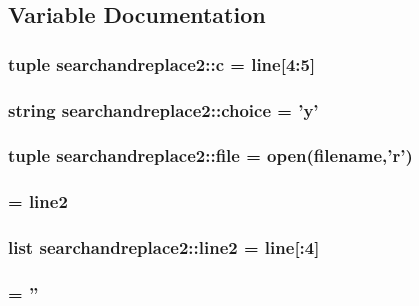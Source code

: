 \subsection{Variable Documentation}
\hypertarget{namespacesearchandreplace2_a3eef88240d5197333eeec54ea8790760}{
\subsubsection[{c}]{\setlength{\rightskip}{0pt plus 5cm}tuple {\bf searchandreplace2::c} = {\bf line}\mbox{[}4:5\mbox{]}}}
\label{namespacesearchandreplace2_a3eef88240d5197333eeec54ea8790760}
\hypertarget{namespacesearchandreplace2_a0b33cdf2d68e113792cf457aa40e09e4}{
\subsubsection[{choice}]{\setlength{\rightskip}{0pt plus 5cm}string {\bf searchandreplace2::choice} = 'y'}}
\label{namespacesearchandreplace2_a0b33cdf2d68e113792cf457aa40e09e4}
\hypertarget{namespacesearchandreplace2_a2807d39a49d7218457401f7d0bdbf9a2}{
\subsubsection[{file}]{\setlength{\rightskip}{0pt plus 5cm}tuple {\bf searchandreplace2::file} = open(filename,'r')}}
\label{namespacesearchandreplace2_a2807d39a49d7218457401f7d0bdbf9a2}
\hypertarget{namespacesearchandreplace2_ab9e22bdeaf96c9e66ce103b442a9bc89}{
\subsubsection[{line}]{ = {\bf line2}}}
\label{namespacesearchandreplace2_ab9e22bdeaf96c9e66ce103b442a9bc89}
\hypertarget{namespacesearchandreplace2_a0e57eecc1067aa2d3c5e556bbe67e115}{
\subsubsection[{line2}]{\setlength{\rightskip}{0pt plus 5cm}list {\bf searchandreplace2::line2} = {\bf line}\mbox{[}:4\mbox{]}}}
\label{namespacesearchandreplace2_a0e57eecc1067aa2d3c5e556bbe67e115}
\hypertarget{namespacesearchandreplace2_a171e4f45668f07d4e371b2394c1cedaf}{
\subsubsection[{s}]{ = ''}}
\label{namespacesearchandreplace2_a171e4f45668f07d4e371b2394c1cedaf}
